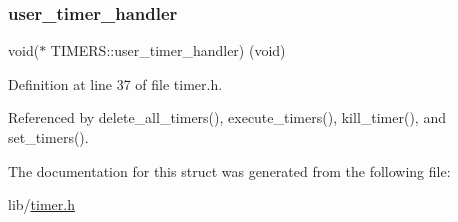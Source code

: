 \subsubsection{\texorpdfstring{user\+\_\+timer\+\_\+handler}{user\_timer\_handler}}
{\footnotesize\ttfamily void($\ast$ T\+I\+M\+E\+R\+S\+::user\+\_\+timer\+\_\+handler) (void)}



Definition at line 37 of file timer.\+h.



Referenced by delete\+\_\+all\+\_\+timers(), execute\+\_\+timers(), kill\+\_\+timer(), and set\+\_\+timers().



The documentation for this struct was generated from the following file\+:\begin{DoxyCompactItemize}
\item 
lib/\hyperlink{timer_8h}{timer.\+h}\end{DoxyCompactItemize}
